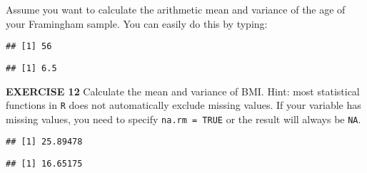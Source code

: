 \documentclass[
]{article}
\newenvironment{Shaded}{\begin{snugshade}}{\end{snugshade}}
\newcommand{\CommentTok}[1]{\textcolor[rgb]{0.56,0.35,0.01}{\textit{#1}}}
\newcommand{\DataTypeTok}[1]{\textcolor[rgb]{0.13,0.29,0.53}{#1}}
\newcommand{\KeywordTok}[1]{\textcolor[rgb]{0.13,0.29,0.53}{\textbf{#1}}}
\newcommand{\NormalTok}[1]{#1}
\newcommand{\OperatorTok}[1]{\textcolor[rgb]{0.81,0.36,0.00}{\textbf{#1}}}
\newcommand{\OtherTok}[1]{\textcolor[rgb]{0.56,0.35,0.01}{#1}}
\begin{document}
Assume you want to calculate the arithmetic mean and variance of the age
of your Framingham sample. You can easily do this by typing:

\begin{Shaded}
\end{Shaded}

\begin{verbatim}
## [1] 56
\end{verbatim}

\begin{Shaded}
\end{Shaded}

\begin{verbatim}
## [1] 6.5
\end{verbatim}

\textbf{EXERCISE 12} Calculate the mean and variance of BMI. Hint: most
statistical functions in \texttt{R} does not automatically exclude
missing values. If your variable has missing values, you need to specify
\texttt{na.rm\ =\ TRUE} or the result will always be \texttt{NA}.

\begin{Shaded}
\end{Shaded}

\begin{verbatim}
## [1] 25.89478
\end{verbatim}

\begin{Shaded}
\end{Shaded}

\begin{verbatim}
## [1] 16.65175
\end{verbatim}
\end{document}
